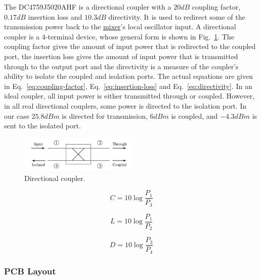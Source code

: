 The DC4759J5020AHF is a directional coupler with a $20 \si{dB}$ coupling factor, $0.17 \si{dB}$
insertion loss and $10.3 \si{dB}$ directivity. It is used to redirect some of the transmission power
back to the \hyperref[sec:adl5802]{mixer}'s local oscillator input. A directional coupler is a
4-terminal device, whose general form is shown in Fig.~\ref{fig:directional-coupler}. The coupling
factor gives the amount of input power that is redirected to the coupled port, the insertion loss
gives the amount of input power that is transmitted through to the output port and the directivity
is a measure of the coupler's ability to isolate the coupled and isolation ports. The actual
equations are given in Eq.~\ref{eq:coupling-factor}, Eq.~\ref{eq:insertion-loss} and
Eq.~\ref{eq:directivity}. In an ideal coupler, all input power is either transmitted through or
coupled. However, in all real directional couplers, some power is directed to the isolation port. In
our case $25.8 \si{dBm}$ is directed for transmission, $6 \si{dBm}$ is coupled, and $-4.3 \si{dBm}$
is sent to the isolated port.

\begin{figure}[h]
        \centering
        \includegraphics[width=0.5\textwidth]{data/directional-coupler}
        \caption{Directional coupler.}
        \label{fig:directional-coupler}
\end{figure}

\begin{equation}
        \label{eq:coupling-factor}
        C = 10 \log \frac{P_1}{P_3}
\end{equation}

\begin{equation}
        \label{eq:insertion-loss}
        L = 10 \log \frac{P_1}{P_2}
\end{equation}

\begin{equation}
        \label{eq:directivity}
        D = 10 \log \frac{P_3}{P_4}
\end{equation}

\subsubsection{PCB Layout}
\label{sec:dc4759j5020ahf-pcb}

